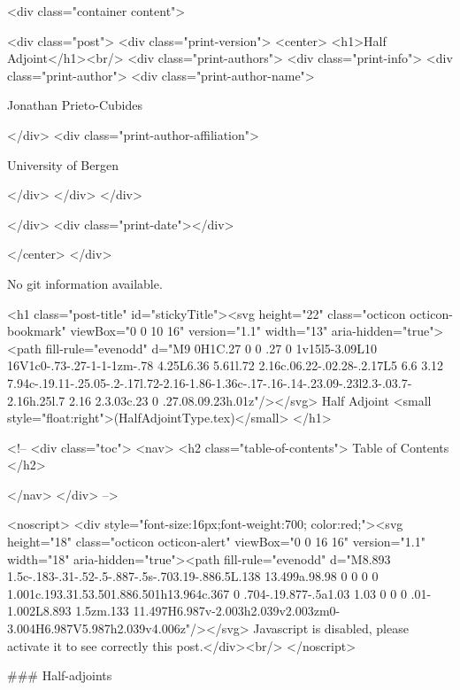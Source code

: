       <div class="container content">
        







<div class="post">
  <div class="print-version">
    <center>
      <h1>Half Adjoint</h1><br/>
        <div class="print-authors">
          <div class="print-info">
            <div class="print-author">
              <div class="print-author-name">
                
                  Jonathan Prieto-Cubides
                
              </div>
              <div class="print-author-affiliation">
                
                  University of Bergen
                
                </div>
            </div>
          </div>
          
          
        </div>
        <div class="print-date"></div>
        
        
    </center>
  </div>

  
  No git information available.
  

  <h1 class="post-title" id="stickyTitle"><svg height="22" class="octicon octicon-bookmark" viewBox="0 0 10 16" version="1.1" width="13" aria-hidden="true"><path fill-rule="evenodd" d="M9 0H1C.27 0 0 .27 0 1v15l5-3.09L10 16V1c0-.73-.27-1-1-1zm-.78 4.25L6.36 5.61l.72 2.16c.06.22-.02.28-.2.17L5 6.6 3.12 7.94c-.19.11-.25.05-.2-.17l.72-2.16-1.86-1.36c-.17-.16-.14-.23.09-.23l2.3-.03.7-2.16h.25l.7 2.16 2.3.03c.23 0 .27.08.09.23h.01z"/></svg> Half Adjoint <small style="float:right">(HalfAdjointType.tex)</small>
  </h1>

  <!-- 
  <div class="toc">
    <nav>
    <h2 class="table-of-contents"> Table of Contents </h2>
      

    </nav>
  </div>
   -->

  <noscript>
  <div style="font-size:16px;font-weight:700; color:red;"><svg height="18" class="octicon octicon-alert" viewBox="0 0 16 16" version="1.1" width="18" aria-hidden="true"><path fill-rule="evenodd" d="M8.893 1.5c-.183-.31-.52-.5-.887-.5s-.703.19-.886.5L.138 13.499a.98.98 0 0 0 0 1.001c.193.31.53.501.886.501h13.964c.367 0 .704-.19.877-.5a1.03 1.03 0 0 0 .01-1.002L8.893 1.5zm.133 11.497H6.987v-2.003h2.039v2.003zm0-3.004H6.987V5.987h2.039v4.006z"/></svg> Javascript is disabled, please activate it to see correctly this post.</div><br/>
  </noscript>

  ### Half-adjoints

